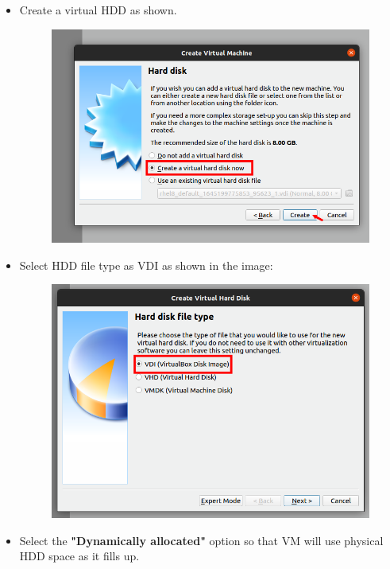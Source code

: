 \begin{flushleft}
\begin{itemize}
	\newpage
	\item Create a virtual HDD as shown.
	\begin{figure}[h!]
		\centering
		\includegraphics[scale=.3]{content/chapter18/images/image4.png}
	\end{figure}		

	
	\item Select HDD file type as VDI as shown in the image:
	\begin{figure}[h!]
		\centering
		\includegraphics[scale=.3]{content/chapter18/images/image5.png}
	\end{figure}		
	
	\item Select the \textbf{"Dynamically allocated"} option so that VM will use physical HDD space as it fills up.
	

\end{itemize}
\end{flushleft}
